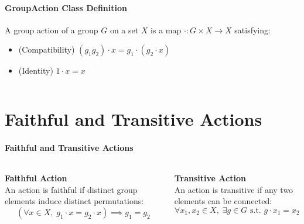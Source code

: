 \documentclass[
	aspectratio=169, %
	t, %
	onlytextwidth, %
	10pt, %
]{beamer}
\newcommand{\leancodeurl}{}
\newcommand{\setleancodeurl}[1]{\renewcommand{\leancodeurl}{#1}}
\newcommand{\leancodefile}[3][]{%
    \setleancodeurl{#3}%
    \inputminted[fontfamily=FreeMono,breaklines,breakanywhere,tabsize=4,showspaces=false,linenos=true,#1]{lean4}{#2}%
}
\begin{document}
\begin{frame}
	\framesubtitle{GroupAction Class Definition}

	\begin{definition}
		A group action of a group $G$ on a set $X$ is a map $\cdot : G \times X \to X$ satisfying:
		\begin{itemize}
			\item (Compatibility) $(g_1 g_2)\cdot x = g_1\cdot(g_2\cdot x)$
			\item (Identity) $1\cdot x = x$
		\end{itemize}
	\end{definition}

	\vspace{0.5cm}

	\leancodefile[
		firstline=12,
		lastline=22,
		firstnumber=12
	]{../../lean/GroupAction/Defs.lean}{https://github.com/FrankieeW/GroupAction/blob/main/lean/GroupAction/Defs.lean}
\end{frame}


\section{Faithful and Transitive Actions}

\begin{frame}
	\framesubtitle{Faithful and Transitive Actions}

	\begin{columns}[T]
		\begin{column}{0.48\textwidth}
			\textbf{Faithful Action}\\
			An action is faithful if distinct group elements induce distinct permutations:
			\[
				(\forall x \in X,\; g_1 \cdot x = g_2 \cdot x) \implies g_1 = g_2
			\]

			\leancodefile[
				firstline=25,
				lastline=26,
				firstnumber=25
			]{../../lean/GroupAction/Defs.lean}{https://github.com/FrankieeW/GroupAction/blob/main/lean/GroupAction/Defs.lean}
		\end{column}
		\begin{column}{0.48\textwidth}
			\textbf{Transitive Action}\\
			An action is transitive if any two elements can be connected:
			\[
				\forall x_1, x_2 \in X,\; \exists g \in G \text{ s.t. } g \cdot x_1 = x_2
			\]

			\leancodefile[
				firstline=33,
				lastline=40,
				firstnumber=33
			]{../../lean/GroupAction/Defs.lean}{https://github.com/FrankieeW/GroupAction/blob/main/lean/GroupAction/Defs.lean}
		\end{column}
	\end{columns}
\end{frame}
\end{document}
